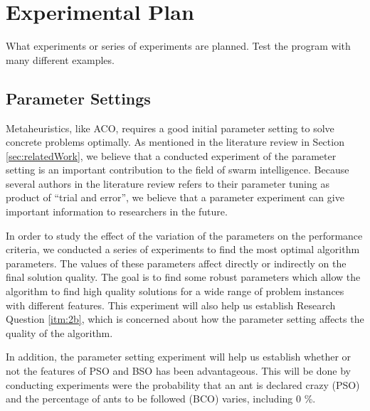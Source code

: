\section{Experimental Plan}

What experiments or series of experiments are planned. Test the program with many different examples.

\subsection{Parameter Settings}
\label{subsec:parameterSettings_plan}
Metaheuristics, like ACO, requires a good initial parameter setting to solve concrete problems optimally. As mentioned in the literature review in Section \vref{sec:relatedWork}, we believe that a conducted experiment of the parameter setting is an important contribution to the field of swarm intelligence. Because several authors in the literature review refers to their parameter tuning as product of ``trial and error'', we believe that a parameter experiment can give important information to researchers in the future. 

In order to study the effect of the variation of the parameters on the performance criteria, we conducted a series of experiments to find the most optimal algorithm parameters. The values of these parameters affect directly or indirectly on the final solution quality. The goal is to find some robust parameters which allow the algorithm to find high quality solutions for a wide range of problem instances with different features. This experiment will also help us establish Research Question \vref{itm:2b}, which is concerned about how the parameter setting affects the quality of the algorithm.

In addition, the parameter setting experiment will help us establish whether or not the features of PSO and BSO has been advantageous. This will be done by conducting experiments were the probability that an ant is declared crazy (PSO) and the percentage of ants to be followed (BCO) varies, including 0 \%. 

